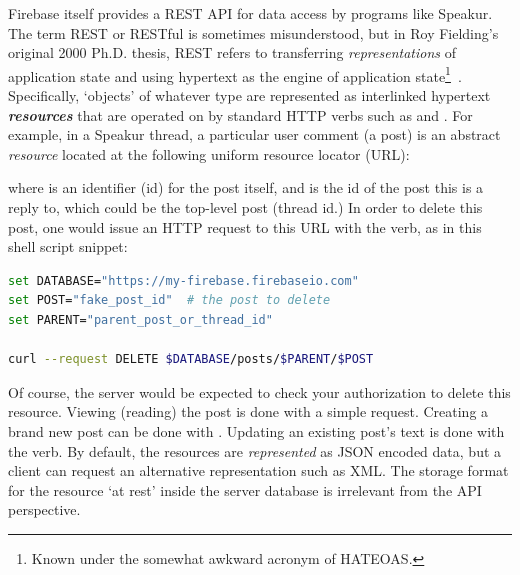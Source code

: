 Firebase itself provides a REST API for data access by programs like Speakur.
The term REST or RESTful is sometimes misunderstood,
but in Roy Fielding's original 2000 Ph.D. thesis, 
REST refers to transferring \textit{representations} of application state and using hypertext as the engine of 
application state\footnote{Known under the somewhat awkward acronym of HATEOAS.}~\cite{fielding2000}.
Specifically, `objects' of whatever type are represented as interlinked hypertext \textbf{\textit{resources}} that are operated on by standard HTTP verbs such as  and .
For example, in a Speakur thread, a particular user comment (a post) is an abstract \textit{resource} located at the following uniform resource locator (URL):



where  is an identifier (id) for the post itself, and  is the id of the post this is a reply to, 
which could be the top-level post (thread id.) 
In order to delete this post, one would issue an HTTP request to this URL with the  verb, as in this  shell script snippet:

\begin{lstlisting}[language=bash,caption=
{Deleting a post with the REST API.},label=l:rest_delete,captionpos=below]
set DATABASE="https://my-firebase.firebaseio.com"
set POST="fake_post_id"  # the post to delete
set PARENT="parent_post_or_thread_id"

curl --request DELETE $DATABASE/posts/$PARENT/$POST
\end{lstlisting}

Of course, the server would be expected to check your authorization to delete this resource.
Viewing (reading) the post is done with a simple  request.
Creating a brand new post can be done with .
Updating an existing post's text is done with the  verb.
By default, the resources are \textit{represented} as JSON encoded data, 
but a client can request an alternative representation such as XML.
The storage format for the resource `at rest' inside the server database is irrelevant from the API perspective.

